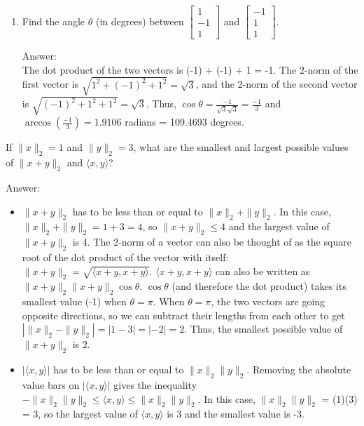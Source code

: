 \documentclass[11pt]{amsart}
\begin{document}
{\begin{enumerate}
{\begin{enumerate}
\item Find the angle $\theta$ (in degrees) between $\begin{bmatrix} 1 \\ -1\\ 1\end{bmatrix}$ and $\begin{bmatrix} -1 \\ 1\\ 1\end{bmatrix}$.

Answer: \\
The dot product of the two vectors is (-1) + (-1) + 1 = -1. The 2-norm of the first vector is $\sqrt{1^2 + (-1)^2 + 1^2} = \sqrt{3}$, and the 2-norm of the second vector is $\sqrt{(-1)^2 + 1^2 + 1^2} = \sqrt{3}$. Thus, $\cos \theta = \frac{-1}{\sqrt{3} \sqrt{3}} = \frac{-1}{3}$ and $\arccos(\frac{-1}{3}) = 1.9106$ radians = 109.4693 degrees.


\end{enumerate}
\bigskip 

\item[Problem 10:]  If $\|x\|_2 = 1$ and $\|y\|_2 = 3$, what are the smallest and largest possible values of $\|x+y\|_2$ and $\langle x, y \rangle$?

Answer: 
\begin{itemize}
\item $\|x+y\|_2$ has to be less than or equal to $\|x\|_2 + \|y\|_2$. In this case, $\|x\|_2 + \|y\|_2 = 1 + 3 = 4$, so $\|x+y\|_2 \leq 4$ and the largest value of $\|x+y\|_2$ is 4. The 2-norm of a vector can also be thought of as the square root of the dot product of the vector with itself: $\|x+y\|_2 = \sqrt{\langle x + y, x + y \rangle}$. $\langle x + y, x + y \rangle$ can also be written as $\|x+y\|_2\|x+y\|_2 \cos \theta$. $\cos \theta$ (and therefore the dot product) takes its smallest value (-1) when $\theta = \pi$. When $\theta = \pi$, the two vectors are going opposite directions, so we can subtract their lengths from each other to get $|\|x\|_2 - \|y\|_2| = |1 - 3| = |-2| = 2$. Thus, the smallest possible value of $\|x+y\|_2$ is 2. \\
\item $|\langle x, y \rangle|$ has to be less than or equal to $\|x\|_2\|y\|_2$. Removing the absolute value bars on $|\langle x, y \rangle|$ gives the inequality $-\|x\|_2\|y\|_2 \leq \langle x, y \rangle \leq \|x\|_2\|y\|_2$. In this case, $\|x\|_2\|y\|_2$ = (1)(3) = 3, so the largest value of $\langle x, y \rangle$ is 3 and the smallest value is -3.
\end{itemize}

}
\end{enumerate}}
\end{document}
